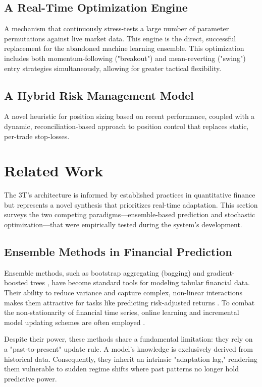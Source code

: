 \documentclass[10pt]{article}
\begin{document}
\subsection{A Real-Time Optimization Engine} 

A mechanism that continuously stress-tests a large number of parameter permutations against live market data. This engine is the direct, successful replacement for the abandoned machine learning ensemble. This optimization includes both momentum-following ("breakout")\cite{lefevre1923} and mean-reverting ("swing")\cite{taylor1950} entry strategies simultaneously, allowing for greater tactical flexibility.

\subsection{A Hybrid Risk Management Model}

A novel heuristic for position sizing based on recent performance, coupled with a dynamic, reconciliation-based approach to position control that replaces static, per-trade stop-losses.

\section{Related Work}
The 3T's architecture is informed by established practices in quantitative finance but represents a novel synthesis that prioritizes real-time adaptation. This section surveys the two competing paradigms—ensemble-based prediction and stochastic optimization—that were empirically tested during the system's development.

\subsection{Ensemble Methods in Financial Prediction}
Ensemble methods, such as bootstrap aggregating (bagging) \cite{ref:bagging} and gradient-boosted trees \cite{ref:xgboost, ref:lightgbm, ref:catboost}, have become standard tools for modeling tabular financial data. Their ability to reduce variance and capture complex, non-linear interactions makes them attractive for tasks like predicting risk-adjusted returns \cite{ref:ensemble_finance}. To combat the non-stationarity of financial time series, online learning and incremental model updating schemes are often employed \cite{ref:online_learning}.

Despite their power, these methods share a fundamental limitation: they rely on a "past-to-present" update rule. A model's knowledge is exclusively derived from historical data. Consequently, they inherit an intrinsic "adaptation lag," rendering them vulnerable to sudden regime shifts where past patterns no longer hold predictive power.
\end{document}
